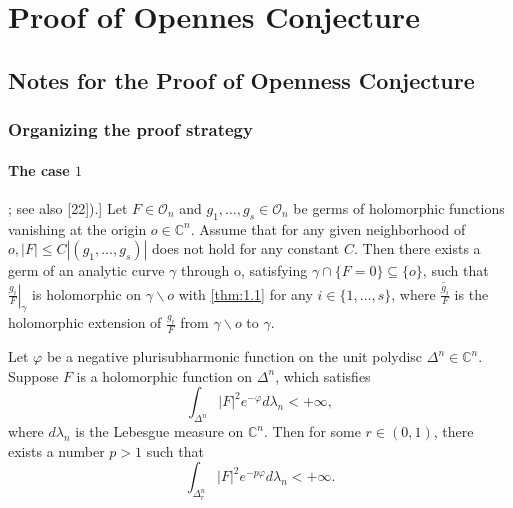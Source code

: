 \documentclass[lang=en,12pt,twoside]{textbook}
\begin{document}
\begin{titlepage}
    \tableofcontents
    \restoregeometry
\end{titlepage}


\part{Proof of Opennes Conjecture}


\chapter{Notes for the Proof of Openness Conjecture}

\section{Organizing the proof strategy}
\subsection{The case \texorpdfstring{$1$}{}}

\begin{lemma}[Lemma 2.3 (see [8]; see also [22]).]\label{lem:2.3}
     Let $F \in \mathcal{O}_n$ and $g_1, \ldots, g_s \in \mathcal{O}_n$ be germs of holomorphic functions vanishing at the origin $o \in \mathbb{C}^n$. Assume that for any given neighborhood of $o,|F| \leq C\left|\left(g_1, \ldots, g_s\right)\right|$ does not hold for any constant $C$. Then there exists a germ of an analytic curve $\gamma$ through o, satisfying $\gamma \cap\{F=0\} \subseteq\{o\}$, such that $\left.\frac{g_i}{F}\right|_\gamma$ is holomorphic on $\gamma \backslash o$ with \ref{thm:1.1} for any $i \in\{1, \ldots, s\}$, where $\frac{\widetilde{g_i}}{F}$ is the holomorphic extension of $\frac{g_i}{F}$ from $\gamma \backslash o$ to $\gamma$.
\end{lemma}

\begin{theorem}\label{thm:1.1}
    Let $\varphi$ be a negative plurisubharmonic function on the unit polydisc
    $\Delta^n \in \mathbb{C}^n$. Suppose $F$ is a holomorphic function on
    $\Delta^n$, which satisfies
    \[ \int_{\Delta^n} | F |^2 e^{- \varphi} d \lambda_n < + \infty, \]
    where $d \lambda_n$ is the Lebesgue measure on $\mathbb{C}^n$. Then for some
$r \in (0, 1)$, there exists a number $p > 1$ such that
\[ \int_{\Delta^n_r} | F |^2 e^{- p \varphi} d \lambda_n < + \infty . \]
\end{theorem}
\end{document}

